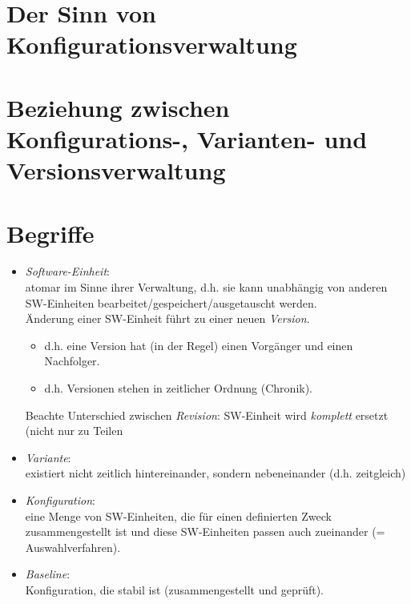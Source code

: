 \section{Der Sinn von Konfigurationsverwaltung}

\section{Beziehung zwischen Konfigurations-, Varianten- und Versionsverwaltung}

\section{Begriffe}
\begin{itemize}
\item \emph{Software-Einheit}:\\
atomar im Sinne ihrer Verwaltung, d.h. sie kann unabhängig von anderen SW-Einheiten bearbeitet/gespeichert/ausgetauscht werden.\\
Änderung einer SW-Einheit führt zu einer neuen \emph{Version}.
\begin{itemize}[label=$\rightarrow$]
\item d.h. eine Version hat (in der Regel) einen Vorgänger und einen Nachfolger.
\item d.h. Versionen stehen in zeitlicher Ordnung (Chronik).
\end{itemize}
Beachte Unterschied zwischen \emph{Revision}: SW-Einheit wird \emph{komplett} ersetzt (nicht nur zu Teilen
\item \emph{Variante}:\\
existiert nicht zeitlich hintereinander, sondern nebeneinander (d.h. zeitgleich)
\item \emph{Konfiguration}:\\
eine Menge von SW-Einheiten, die für einen definierten Zweck zusammengestellt ist und diese SW-Einheiten passen auch zueinander (= Auswahlverfahren).
\item \emph{Baseline}:\\
Konfiguration, die stabil ist (zusammengestellt und geprüft).
\end{itemize}

